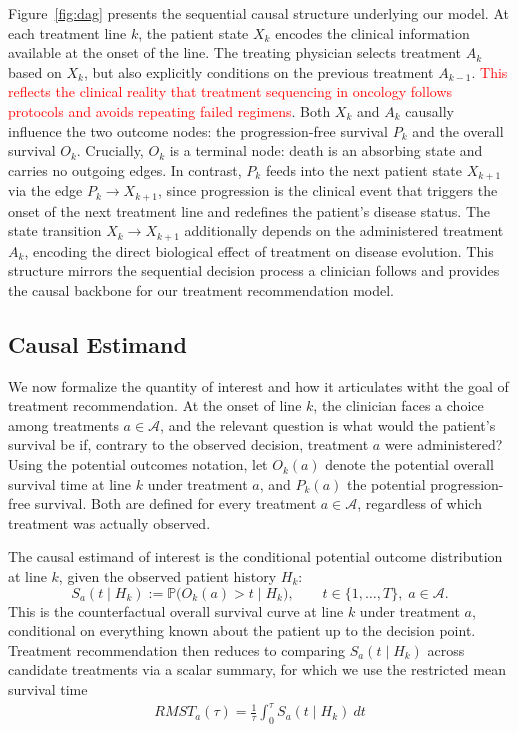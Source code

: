 \documentclass[a4paper,10pt]{article}
\begin{document}
Figure~\ref{fig:dag} presents the sequential causal structure underlying our model. At each treatment line $k$, the patient state $X_k$ encodes the clinical information available at the onset of the line. The treating physician selects treatment $A_k$ based on $X_k$, but also explicitly conditions on the previous treatment $A_{k-1}$. \textcolor{red}{This reflects the clinical reality that treatment sequencing in oncology follows protocols and avoids repeating failed regimens}. Both $X_k$ and $A_k$ causally influence the two outcome nodes: the progression-free survival $P_k$ and the overall survival $O_k$. Crucially, $O_k$ is a terminal node: death is an absorbing state and carries no outgoing edges. In contrast, $P_k$ feeds into the next patient state $X_{k+1}$ via the edge $P_k \rightarrow X_{k+1}$, since progression is the clinical event that triggers the onset of the next treatment line and redefines the patient's disease status. The state transition $X_k \rightarrow X_{k+1}$ additionally depends on the administered treatment $A_k$, encoding the direct biological effect of treatment on disease evolution. This structure mirrors the sequential decision process a clinician follows and provides the causal backbone for our treatment recommendation model.

\subsection{Causal Estimand}
\label{sec:estimand}

We now formalize the quantity of interest and how it articulates witht the goal of treatment recommendation. At the onset of line $k$, the clinician faces a choice among treatments $a \in \mathcal{A}$, and the relevant question is what would the patient's survival be if, contrary to the observed decision, treatment $a$ were administered? Using the potential outcomes notation, let $O_k(a)$ denote the potential overall survival time at line $k$ under treatment $a$, and $P_k(a)$ the potential progression-free survival. Both are defined for every treatment $a \in \mathcal{A}$, regardless of which treatment was actually observed.

The causal estimand of interest is the conditional potential outcome distribution at line $k$, given the observed patient history $H_k$:
\begin{equation}
    S_a(t \mid H_k) := \mathbb{P}\big(O_k(a) > t \mid H_k\big), \qquad t \in \{1, \ldots, T\},\; a \in \mathcal{A}.
    \label{eq:estimand}
\end{equation}
This is the counterfactual overall survival curve at line $k$ under treatment $a$, conditional on everything known about the patient up to the decision point. Treatment recommendation then reduces to comparing $S_a(t \mid H_k)$ across candidate treatments via a scalar summary, for which we use the restricted mean survival time
\begin{align}
    RMST_a(\tau) = \frac{1}{\tau} \int_{0}^{\tau} S_a(t \mid H_k)\  dt
\end{align}
\end{document}
